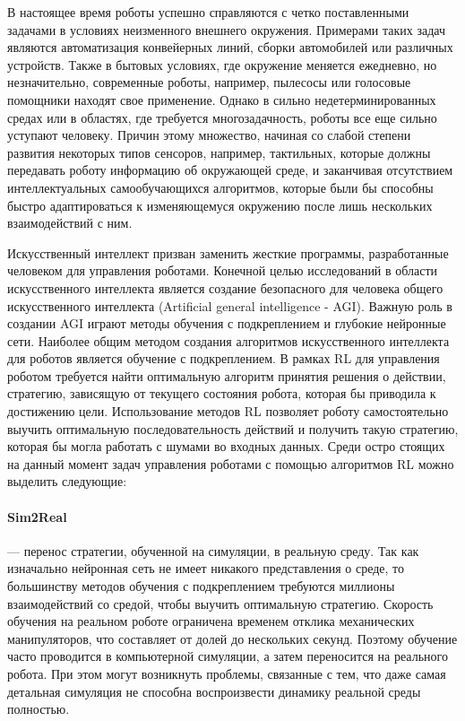 В настоящее время роботы успешно справляются с четко поставленными задачами в условиях неизменного внешнего окружения. Примерами таких задач являются автоматизация конвейерных линий, сборки автомобилей или различных устройств. Также в бытовых условиях, где окружение меняется ежедневно, но незначительно, современные роботы, например, пылесосы или голосовые помощники находят свое применение. Однако в сильно недетерминированных средах или в областях, где требуется многозадачность, роботы все еще сильно уступают человеку. Причин этому множество, начиная со слабой степени развития некоторых типов сенсоров, например, тактильных, которые должны передавать роботу информацию об окружающей среде, и заканчивая отсутствием интеллектуальных самообучающихся алгоритмов, которые были бы способны быстро адаптироваться к изменяющемуся окружению после лишь нескольких взаимодействий с ним. 

Искусственный интеллект призван заменить жесткие программы, разработанные человеком для управления роботами. Конечной целью исследований в области искусственного интеллекта является создание безопасного для человека общего искусственного интеллекта (Artificial general intelligence - AGI). Важную роль в создании AGI играют методы обучения с подкреплением и глубокие нейронные сети. 
Наиболее общим методом создания алгоритмов искусственного интеллекта для роботов является обучение с подкреплением. В рамках RL для управления роботом требуется найти оптимальную алгоритм принятия решения о действии, стратегию, зависящую от текущего состояния робота, которая бы приводила к достижению цели. Использование методов RL позволяет роботу самостоятельно выучить оптимальную последовательность действий и получить такую стратегию, которая бы могла работать с шумами во входных данных. Среди остро стоящих на данный момент задач управления роботами с помощью алгоритмов RL можно выделить следующие:

\paragraph{Sim2Real} --- перенос стратегии, обученной на симуляции, в реальную среду. Так как изначально нейронная сеть не имеет никакого представления о среде, то большинству методов обучения с подкреплением требуются миллионы взаимодействий со средой, чтобы выучить оптимальную стратегию. Скорость обучения на реальном роботе ограничена временем отклика механических манипуляторов, что составляет от долей до нескольких секунд. Поэтому обучение часто проводится в компьютерной симуляции, а затем переносится на реального робота. При этом могут возникнуть проблемы, связанные с тем, что даже самая детальная симуляция не способна воспроизвести динамику реальной среды полностью. 

